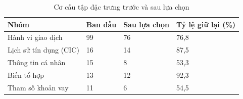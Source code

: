 \begin{table}[!htbp]
\centering
\caption{Cơ cấu tập đặc trưng trước và sau lựa chọn}
\label{tab:selection-group}
\small
\setlength{\tabcolsep}{5.0pt}
\begin{tabular}{@{}L{4.0cm}R{2.8cm}R{3.0cm}R{3.2cm}@{}}
\toprule
\textbf{Nhóm} & \textbf{Ban đầu} & \textbf{Sau lựa chọn} & \textbf{Tỷ lệ giữ lại (\%)} \\
\midrule
Hành vi giao dịch & 99 & 76 & 76,8 \\
Lịch sử tín dụng (CIC) & 16 & 14 & 87,5 \\
Thông tin cá nhân & 15 & 8 & 53,3 \\
Biến tổ hợp & 13 & 12 & 92,3 \\
Tham số khoản vay & 11 & 6 & 54,5 \\
\bottomrule
\end{tabular}
\end{table}
